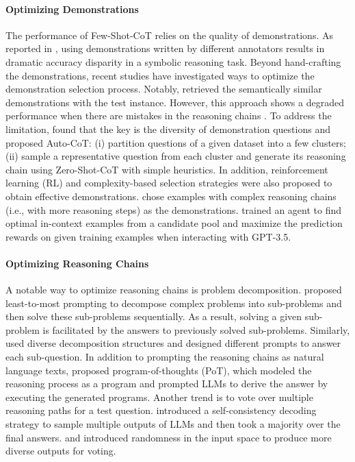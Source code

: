 \documentclass[nohyperref]{article}
\theoremstyle{plain}
\theoremstyle{definition}
\theoremstyle{remark}
\begin{document}
\paragraph{Optimizing Demonstrations} The performance of Few-Shot-CoT relies on the quality of demonstrations. As reported in \citet{cot_wei}, using demonstrations written by different annotators results in dramatic accuracy disparity in a symbolic reasoning task. Beyond hand-crafting the demonstrations, recent studies have investigated ways to optimize the demonstration selection process. Notably, \citet{rubin2021learning} retrieved the semantically similar demonstrations with the test instance. However, this approach shows a degraded performance when there are mistakes in the reasoning chains \citep{zhang2022automatic}. To address the limitation, \citet{zhang2022automatic} found that the key is the diversity of demonstration questions and proposed Auto-CoT: (i) partition questions of a given dataset into a few clusters; (ii) sample a representative question from each cluster and generate its reasoning chain using Zero-Shot-CoT with simple heuristics. In addition, reinforcement learning (RL) and complexity-based selection strategies were also proposed to obtain effective demonstrations. \citet{fu2022complexity} chose examples with complex reasoning chains (i.e., with more reasoning steps) as the demonstrations. \citet{lu2022dynamic} trained an agent to find optimal in-context examples from a candidate pool and maximize the prediction rewards on given training examples when interacting with GPT-3.5.


\paragraph{Optimizing Reasoning Chains} A notable way to optimize reasoning chains is problem decomposition.  \citet{zhou2022least} proposed least-to-most prompting to decompose complex problems into sub-problems and then solve these sub-problems sequentially. As a result, solving a given sub-problem is facilitated by the answers to previously solved sub-problems. Similarly, \citet{khot2022decomposed} used diverse decomposition structures and designed different prompts to answer each sub-question. In addition to prompting the reasoning chains as natural language texts, \citet{chen2022program} proposed program-of-thoughts (PoT), which modeled the reasoning process as a program and prompted LLMs to derive the answer by executing the generated programs. Another trend is to vote over multiple reasoning paths for a test question. \citet{cot_wei_sc} introduced a self-consistency decoding strategy to sample multiple outputs of LLMs and then took a majority over the final answers. \citet{wang2022rationale} and \citet{li2022advance} introduced randomness in the input space to produce more diverse outputs for voting.
\end{document}
